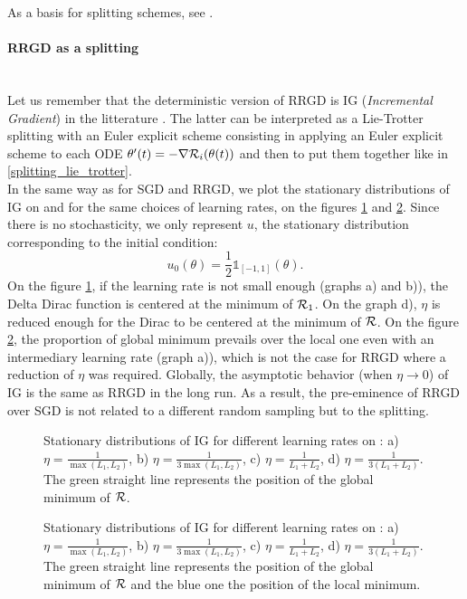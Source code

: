 As a basis for splitting schemes, see \cite{splitting_ode_review,splitting_ode_review2}.

\paragraph{RRGD as a splitting}
~~\\
Let us remember that the deterministic version of RRGD is IG ({\it Incremental Gradient}) in the litterature \cite{IG_proximal}. The latter can be interpreted as a Lie-Trotter
splitting with an Euler explicit scheme consisting in applying an Euler explicit scheme to each ODE $\theta'(t)=-\nabla \mathcal{R}_i(\theta(t))$ and then to put them together like in \eqref{splitting_lie_trotter}. \\
In the same way as for SGD and RRGD, we plot the stationary distributions of IG on \exOne and \exTwo for the same choices of learning rates, on the figures \ref{IG_ex1} and \ref{IG_ex2}. Since there is no stochasticity, we only represent $u$, the stationary distribution corresponding to the initial condition:
\begin{equation*}
	u_0(\theta) = \frac{1}{2} \mathds{1}_{[-1,1]}(\theta).
\end{equation*}
On the figure \ref{IG_ex1}, if the learning rate is not small enough (graphs a) and b)), the Delta Dirac function is centered at the minimum of $\mathcal{R}_1$. On the graph d), $\eta$ is reduced enough for the Dirac to be centered at the minimum of $\mathcal{R}$. On the figure \ref{IG_ex2}, the proportion of global minimum prevails over the local one even with an intermediary learning rate (graph a)), which is not the case for RRGD where a reduction of $\eta$ was required. Globally, the asymptotic behavior (when $\eta \to 0$) of IG is the same as RRGD in the long run. As a result, the pre-eminence of RRGD over SGD is not related to a different random sampling but to the splitting.

\begin{figure}[h!]
	\centering
	\scalebox{0.45}{}
	\caption{Stationary distributions of IG for different learning rates on \exOne: a) $\eta=\frac{1}{\max(L_1,L_2)}$, b) $\eta=\frac{1}{3\max(L_1,L_2)}$, c) $\eta=\frac{1}{L_1+L_2}$, d) $\eta=\frac{1}{3(L_1+L_2)}$. The green straight line represents the position of the global minimum of $\mathcal{R}$.}
	\label{IG_ex1}
\end{figure}

\begin{figure}[h!]
	\centering
	\scalebox{0.45}{}
	\caption{Stationary distributions of IG for different learning rates on \exTwo: a) $\eta=\frac{1}{\max(L_1,L_2)}$, b) $\eta=\frac{1}{3\max(L_1,L_2)}$, c) $\eta=\frac{1}{L_1+L_2}$, d) $\eta=\frac{1}{3(L_1+L_2)}$. The green straight line represents the position of the global minimum of $\mathcal{R}$ and the blue one the position of the local minimum.}
	\label{IG_ex2}
\end{figure}

